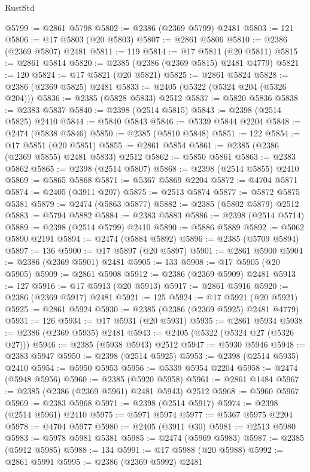 \begin{lexlean}{RustStd}
\begin{coremodule}
@5799 := @2861 @5798
@5802 := @2386 (@2369 @5799) @2481
@5803 := 121
@5806 := @17 @5803 (@20 @5803)
@5807 := @2861 @5806
@5810 := @2386 (@2369 @5807) @2481
@5811 := 119
@5814 := @17 @5811 (@20 @5811)
@5815 := @2861 @5814
@5820 := @2385 (@2386 (@2369 @5815) @2481 @4779)
@5821 := 120
@5824 := @17 @5821 (@20 @5821)
@5825 := @2861 @5824
@5828 := @2386 (@2369 @5825) @2481
@5833 := @2405 (@5322 (@5324 @204 (@5326 @204)))
@5836 := @2385 (@5828 @5833) @2512
@5837 := @5820 @5836
@5838 := @2383 @5837
@5840 := @2398 (@2514 @5815)
@5843 := @2398 (@2514 @5825) @2410
@5844 := @5840 @5843
@5846 := @5339 @5844 @2204
@5848 := @2474 (@5838 @5846)
@5850 := @2385 (@5810 @5848)
@5851 := 122
@5854 := @17 @5851 (@20 @5851)
@5855 := @2861 @5854
@5861 := @2385 (@2386 (@2369 @5855) @2481 @5833) @2512
@5862 := @5850 @5861
@5863 := @2383 @5862
@5865 := @2398 (@2514 @5807)
@5868 := @2398 (@2514 @5855) @2410
@5869 := @5865 @5868
@5871 := @5367 @5869 @2204
@5872 := @4704 @5871
@5874 := @2405 (@3911 @207)
@5875 := @2513 @5874
@5877 := @5872 @5875 @5381
@5879 := @2474 (@5863 @5877)
@5882 := @2385 (@5802 @5879) @2512
@5883 := @5794 @5882
@5884 := @2383 @5883
@5886 := @2398 (@2514 @5714)
@5889 := @2398 (@2514 @5799) @2410
@5890 := @5886 @5889
@5892 := @5062 @5890 @2191
@5894 := @2474 (@5884 @5892)
@5896 := @2385 (@5709 @5894)
@5897 := 136
@5900 := @17 @5897 (@20 @5897)
@5901 := @2861 @5900
@5904 := @2386 (@2369 @5901) @2481
@5905 := 133
@5908 := @17 @5905 (@20 @5905)
@5909 := @2861 @5908
@5912 := @2386 (@2369 @5909) @2481
@5913 := 127
@5916 := @17 @5913 (@20 @5913)
@5917 := @2861 @5916
@5920 := @2386 (@2369 @5917) @2481
@5921 := 125
@5924 := @17 @5921 (@20 @5921)
@5925 := @2861 @5924
@5930 := @2385 (@2386 (@2369 @5925) @2481 @4779)
@5931 := 126
@5934 := @17 @5931 (@20 @5931)
@5935 := @2861 @5934
@5938 := @2386 (@2369 @5935) @2481
@5943 := @2405 (@5322 (@5324 @27 (@5326 @27)))
@5946 := @2385 (@5938 @5943) @2512
@5947 := @5930 @5946
@5948 := @2383 @5947
@5950 := @2398 (@2514 @5925)
@5953 := @2398 (@2514 @5935) @2410
@5954 := @5950 @5953
@5956 := @5339 @5954 @2204
@5958 := @2474 (@5948 @5956)
@5960 := @2385 (@5920 @5958)
@5961 := @2861 @1484
@5967 := @2385 (@2386 (@2369 @5961) @2481 @5943) @2512
@5968 := @5960 @5967
@5969 := @2383 @5968
@5971 := @2398 (@2514 @5917)
@5974 := @2398 (@2514 @5961) @2410
@5975 := @5971 @5974
@5977 := @5367 @5975 @2204
@5978 := @4704 @5977
@5980 := @2405 (@3911 @30)
@5981 := @2513 @5980
@5983 := @5978 @5981 @5381
@5985 := @2474 (@5969 @5983)
@5987 := @2385 (@5912 @5985)
@5988 := 134
@5991 := @17 @5988 (@20 @5988)
@5992 := @2861 @5991
@5995 := @2386 (@2369 @5992) @2481

\end{coremodule}
\end{lexlean}
